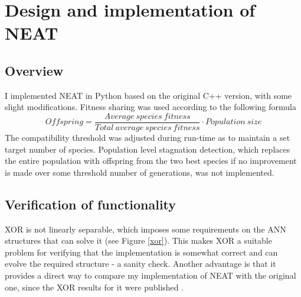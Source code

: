 \section{Design and implementation of NEAT}

\subsection{Overview}
I implemented NEAT in Python based on the original C++ version, with some slight modifications.
Fitness sharing was used according to the following formula
\begin{equation*} \label{eq:1}
    Offspring = \frac{Average\:species\:fitness}{Total\:average\:species\:fitness} \cdot Population\:size
\end{equation*}
The compatibility threshold was adjusted during run-time as to maintain a set target number of species.
Population level stagnation detection, which replaces the entire population with offspring from the two best species
if no improvement is made over some threshold number of generations, was not implemented.

\subsection{Verification of functionality}
XOR is not linearly separable, which imposes some requirements on the ANN structures that can solve it (see Figure \ref{xor}).
This makes XOR a suitable problem for verifying that the implementation is somewhat correct and can evolve
the required structure - a sanity check. Another advantage is that it provides a direct way to compare my
implementation of NEAT with the original one, since the XOR results for it were published \cite{neat_main}.


